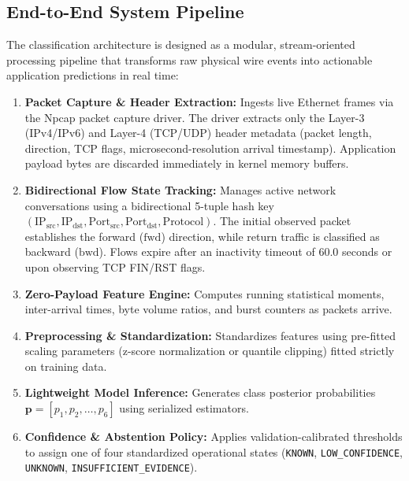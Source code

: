 \documentclass[conference]{IEEEtran}
\begin{document}
\subsection{End-to-End System Pipeline}
The classification architecture is designed as a modular, stream-oriented processing pipeline that transforms raw physical wire events into actionable application predictions in real time:
\begin{enumerate}
    \item \textbf{Packet Capture \& Header Extraction:} Ingests live Ethernet frames via the Npcap packet capture driver. The driver extracts only the Layer-3 (IPv4/IPv6) and Layer-4 (TCP/UDP) header metadata (packet length, direction, TCP flags, microsecond-resolution arrival timestamp). Application payload bytes are discarded immediately in kernel memory buffers.
    \item \textbf{Bidirectional Flow State Tracking:} Manages active network conversations using a bidirectional 5-tuple hash key $(\text{IP}_{\text{src}}, \text{IP}_{\text{dst}}, \text{Port}_{\text{src}}, \text{Port}_{\text{dst}}, \text{Protocol})$. The initial observed packet establishes the forward ($\text{fwd}$) direction, while return traffic is classified as backward ($\text{bwd}$). Flows expire after an inactivity timeout of 60.0 seconds or upon observing TCP FIN/RST flags.
    \item \textbf{Zero-Payload Feature Engine:} Computes running statistical moments, inter-arrival times, byte volume ratios, and burst counters as packets arrive.
    \item \textbf{Preprocessing \& Standardization:} Standardizes features using pre-fitted scaling parameters (z-score normalization or quantile clipping) fitted strictly on training data.
    \item \textbf{Lightweight Model Inference:} Generates class posterior probabilities $\mathbf{p} = [p_1, p_2, \dots, p_6]$ using serialized estimators.
    \item \textbf{Confidence \& Abstention Policy:} Applies validation-calibrated thresholds to assign one of four standardized operational states (\texttt{KNOWN}, \texttt{LOW\_CONFIDENCE}, \texttt{UNKNOWN}, \texttt{INSUFFICIENT\_EVIDENCE}).
\end{enumerate}
\end{document}
